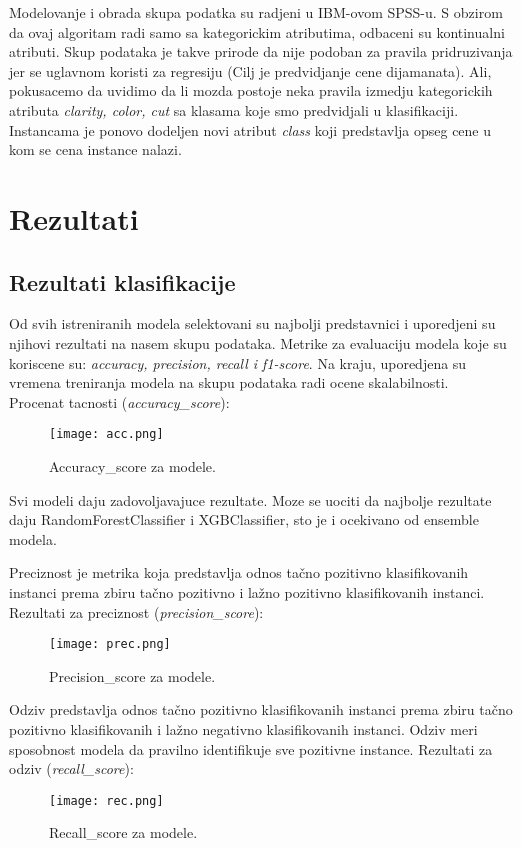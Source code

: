 \documentclass[10pt]{article}
\begin{document}
Modelovanje i obrada skupa podatka su radjeni u IBM-ovom SPSS-u. S obzirom da ovaj algoritam radi samo sa kategorickim atributima, odbaceni su kontinualni atributi. Skup podataka je takve prirode da nije podoban za pravila pridruzivanja jer se uglavnom koristi za regresiju (Cilj je predvidjanje cene dijamanata). Ali, pokusacemo da uvidimo da li mozda postoje neka pravila izmedju kategorickih atributa \textit{clarity, color, cut} sa klasama koje smo predvidjali u klasifikaciji. Instancama je ponovo dodeljen novi atribut \textit{class} koji predstavlja opseg cene u kom se cena instance nalazi.


\newpage
\section{Rezultati}
\subsection*{Rezultati klasifikacije}
Od svih istreniranih modela selektovani su najbolji predstavnici i uporedjeni su njihovi rezultati na nasem skupu podataka. Metrike za evaluaciju modela koje su koriscene su: \textit{accuracy, precision, recall i f1-score}. Na kraju, uporedjena su vremena treniranja modela na skupu podataka radi ocene skalabilnosti.\\

Procenat tacnosti (\textit{accuracy\_score}):
\begin{figure}[h]
    \centering
    \texttt{[image: acc.png]}
    \caption{Accuracy\_score za modele.}
    \label{Slika1}
\end{figure}

Svi modeli daju zadovoljavajuce rezultate. Moze se uociti da najbolje rezultate daju RandomForestClassifier i XGBClassifier, sto je i ocekivano od ensemble modela.\\
\pagebreak

Preciznost je metrika koja predstavlja odnos tačno pozitivno klasifikovanih instanci prema zbiru tačno pozitivno i lažno pozitivno klasifikovanih instanci. Rezultati za preciznost (\textit{precision\_score}):
\begin{figure}[h]
    \centering
    \texttt{[image: prec.png]}
    \caption{Precision\_score za modele.}
    \label{Slika2}
\end{figure}

Odziv predstavlja odnos tačno pozitivno klasifikovanih instanci prema zbiru tačno pozitivno klasifikovanih i lažno negativno klasifikovanih instanci. Odziv meri sposobnost modela da pravilno identifikuje sve pozitivne instance. Rezultati za odziv (\textit{recall\_score}):
\begin{figure}[h]
    \centering
    \texttt{[image: rec.png]}
    \caption{Recall\_score za modele.}
    \label{Slika3}
\end{figure}
\end{document}
